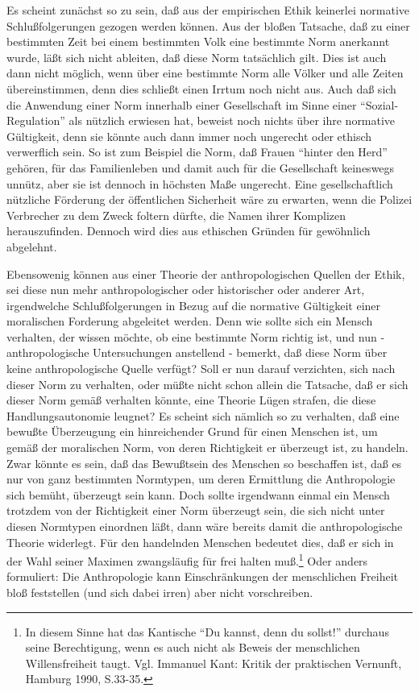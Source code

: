 \documentclass[12pt,a4paper]{article}
\begin{document}
Es scheint zunächst so zu sein, daß aus der empirischen Ethik keinerlei
normative Schlußfolgerungen gezogen werden können. Aus der bloßen
Tatsache, daß zu einer bestimmten Zeit bei einem bestimmten Volk eine
bestimmte Norm anerkannt wurde, läßt sich nicht ableiten, daß diese Norm
tatsächlich gilt. Dies ist auch dann nicht möglich, wenn über eine
bestimmte Norm alle Völker und alle Zeiten übereinstimmen, denn dies
schließt einen Irrtum noch nicht aus. Auch daß sich die Anwendung einer
Norm innerhalb einer Gesellschaft im Sinne einer "`Sozial-Regulation"'
als nützlich erwiesen hat, beweist noch nichts über ihre normative
Gültigkeit, denn sie könnte auch dann immer noch ungerecht oder ethisch
verwerflich sein. So ist zum Beispiel die Norm, daß Frauen "`hinter den
Herd"' gehören, für das Familienleben und damit auch für die
Gesellschaft keineswegs unnütz, aber sie ist dennoch in höchsten Maße
ungerecht. Eine gesellschaftlich nützliche Förderung der öffentlichen
Sicherheit wäre zu erwarten, wenn die Polizei Verbrecher zu dem Zweck
foltern dürfte, die Namen ihrer Komplizen herauszufinden. Dennoch wird
dies aus ethischen Gründen für gewöhnlich abgelehnt.

Ebensowenig können aus einer Theorie der anthropologischen Quellen der Ethik,
sei diese nun mehr anthropologischer oder historischer oder anderer Art,
irgendwelche Schlußfolgerungen in Bezug auf die normative Gültigkeit einer
moralischen Forderung abgeleitet werden. Denn wie sollte sich ein Mensch
verhalten, der wissen möchte, ob eine bestimmte Norm richtig ist, und nun -
anthropologische Untersuchungen anstellend - bemerkt, daß diese Norm über
keine anthropologische Quelle verfügt?  Soll er nun darauf verzichten, sich
nach dieser Norm zu verhalten, oder müßte nicht schon allein die Tatsache, daß
er sich dieser Norm gemäß verhalten könnte, eine Theorie Lügen strafen, die
diese Handlungsautonomie leugnet? Es scheint sich nämlich so zu verhalten, daß
eine bewußte Überzeugung ein hinreichender Grund für einen Menschen ist, um
gemäß der moralischen Norm, von deren Richtigkeit er überzeugt ist, zu
handeln. Zwar könnte es sein, daß das Bewußtsein des Menschen so beschaffen
ist, daß es nur von ganz bestimmten Normtypen, um deren Ermittlung die
Anthropologie sich bemüht, überzeugt sein kann. Doch sollte irgendwann einmal
ein Mensch trotzdem von der Richtigkeit einer Norm überzeugt sein, die sich
nicht unter diesen Normtypen einordnen läßt, dann wäre bereits damit die
anthropologische Theorie widerlegt. Für den handelnden Menschen bedeutet dies,
daß er sich in der Wahl seiner Maximen zwangsläufig für frei halten
muß.\footnote{In diesem Sinne hat das Kantische "`Du kannst, denn du sollst!"'
  durchaus seine Berechtigung, wenn es auch nicht als Beweis der menschlichen
  Willensfreiheit taugt. Vgl. Immanuel Kant: Kritik der praktischen Vernunft,
  Hamburg 1990, S.33-35.} Oder anders formuliert: Die Anthropologie kann
Einschränkungen der menschlichen Freiheit bloß feststellen (und sich dabei
irren) aber nicht vorschreiben.
\end{document}
